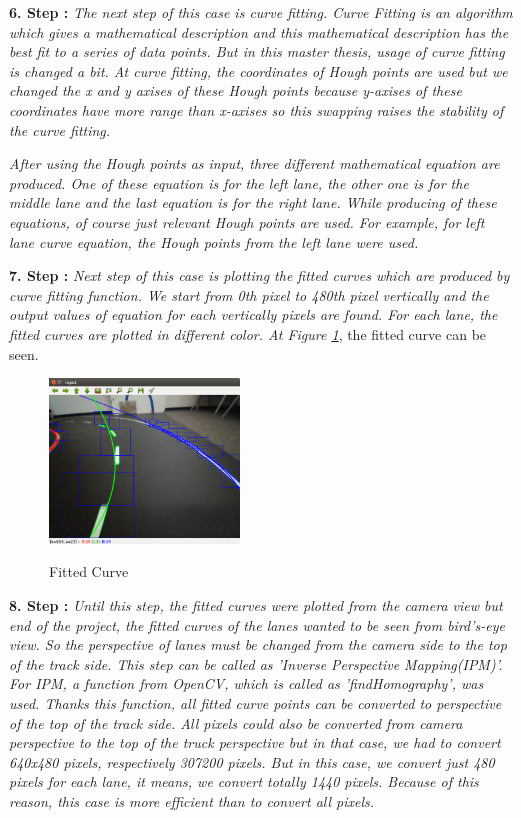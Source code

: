 \textbf{6. Step : }\emph{\color{blue}The next step of this case is curve fitting. Curve Fitting is an algorithm which gives a mathematical description and this mathematical description has the best fit to a series of data points. But in this master thesis, usage of curve fitting is changed a bit. At curve fitting, the coordinates of Hough points are used but we changed the x and y axises of these Hough points because y-axises of these coordinates have more range than x-axises so this swapping raises the stability of the curve fitting.}

\emph{\color{blue}After using the Hough points as input, three different mathematical equation are produced. One of these equation is for the left lane, the other one is for the middle lane and the last equation is for the right lane. While producing of these equations, of course just relevant Hough points are used. For example, for left lane curve equation, the Hough points from the left lane were used.}
 
\textbf{7. Step : }\emph{\color{blue}Next step of this case is plotting the fitted curves which are produced by curve fitting function. We start from 0th pixel to 480th pixel vertically and the output values of equation for each vertically pixels are found. For each lane, the fitted curves are plotted in different color. At Figure \ref{fig:Case1_CurveFittingwithoutIPM.png}}, the fitted curve can be seen.


\begin{figure}[H]
 \centering
  \includegraphics[width=0.45\textwidth]{./Bilder/Case1_CurveFittingwithoutIPM.png}\label{fig:Case1_CurveFittingwithoutIPM.png}
	\caption{Fitted Curve}
\end{figure}


 
\textbf{8. Step : }\emph{\color{blue}Until this step, the fitted curves were plotted from the camera view but end of the project, the fitted curves of the lanes wanted to be seen from bird's-eye view. So the perspective of lanes must be changed from the camera side to the top of the track side. This step can be called as 'Inverse Perspective Mapping(IPM)'. For IPM, a function from OpenCV, which is called as 'findHomography', was used. Thanks this function, all fitted curve points can be converted to perspective of the top of the track side. All pixels could also be converted from camera perspective to the top of the truck perspective but in that case, we had to convert 640x480 pixels, respectively 307200 pixels. But in this case, we convert just 480 pixels for each lane, it means, we convert totally 1440 pixels. Because of this reason, this case is more efficient than to convert all pixels.}
 	 		 	
